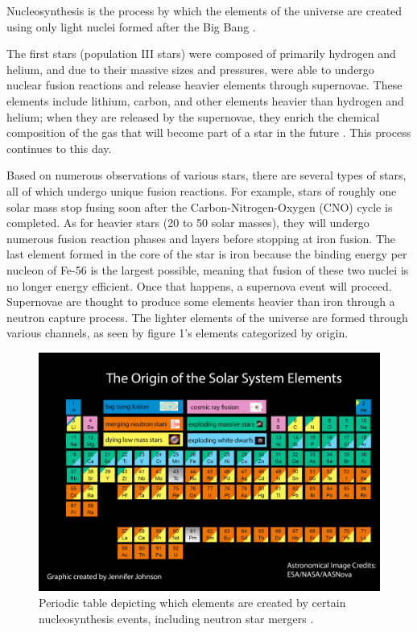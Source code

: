 \documentclass[11pt,a4paper]{article}
\begin{document}
Nucleosynthesis is the process by which the elements of the universe are created using only light nuclei formed after the Big Bang \cite{B2FH_1957} \cite{Cameron_1955} .  

The first stars (population III stars) were composed of primarily hydrogen and helium, and due to their massive sizes and pressures, were able to undergo nuclear fusion reactions and release heavier elements through supernovae. These elements include lithium, carbon, and other elements heavier than hydrogen and helium; when they are released by the supernovae, they enrich the chemical composition of the gas that will become part of a star in the future \cite{Frebel_2005} . This process continues to this day. 

Based on numerous observations of various stars, there are several types of stars, all of which undergo unique fusion reactions. For example, stars of roughly one solar mass stop fusing soon after the Carbon-Nitrogen-Oxygen (CNO) cycle is completed. As for heavier stars (20 to 50 solar masses), they will undergo numerous fusion reaction phases and layers before stopping at iron fusion. The last element formed in the core of the star is iron because the binding energy per nucleon of Fe-56 is the largest possible, meaning that fusion of these two nuclei is no longer energy efficient. Once that happens, a supernova event will proceed. Supernovae are thought to produce some elements heavier than iron through a neutron capture process. The lighter elements of the universe are formed through various channels, as seen by figure 1's elements categorized by origin.

\begin{figure}[h!]
  \includegraphics[width=1\textwidth]{periodic_table.png}
  \caption{Periodic table depicting which elements are created by certain nucleosynthesis events, including neutron star mergers \cite{Johnson_2017}.}
\end{figure}
\end{document}
